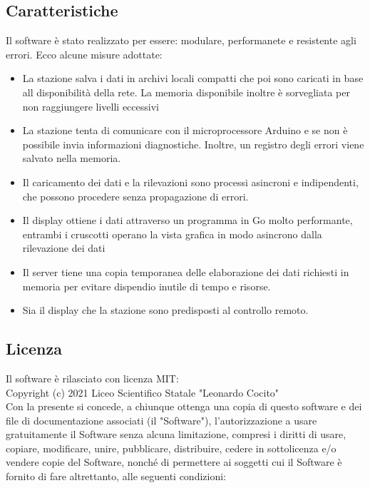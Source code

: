 \documentclass{article}
\begin{document}
\subsection{Caratteristiche}
Il software è stato realizzato per essere: modulare, performanete e resistente agli errori.
Ecco alcune misure adottate:
\begin{itemize}
\item La stazione salva i dati in archivi locali compatti che poi sono caricati in base all disponibilità della rete. La memoria disponibile inoltre è sorvegliata per non raggiungere livelli eccessivi
\item La stazione tenta di comunicare con il microprocessore Arduino e se non è possibile invia informazioni diagnostiche. Inoltre, un registro degli errori viene salvato nella memoria.\\
\item Il caricamento dei dati e la rilevazioni sono processi asincroni e indipendenti, che possono procedere senza propagazione di errori.\\
\item Il display ottiene i dati attraverso un programma in Go molto performante, entrambi i cruscotti operano la vista grafica in modo asincrono dalla rilevazione dei dati\\
\item Il server tiene una copia temporanea delle elaborazione dei dati richiesti in memoria per evitare dispendio inutile di tempo e risorse. \\
\item Sia il display che la stazione sono predisposti al controllo remoto.
\end{itemize}
\subsection{Licenza}
Il software è rilasciato con licenza MIT:\\
Copyright (c) 2021 Liceo Scientifico Statale "Leonardo Cocito"\\

Con la presente si concede, a chiunque ottenga una copia di questo software e dei file di documentazione associati (il "Software"), l'autorizzazione a usare gratuitamente il Software senza alcuna limitazione, compresi i diritti di usare, copiare, modificare, unire, pubblicare, distribuire, cedere in sottolicenza e/o vendere copie del Software, nonché di permettere ai soggetti cui il Software è fornito di fare altrettanto, alle seguenti condizioni:\\
\end{document}
